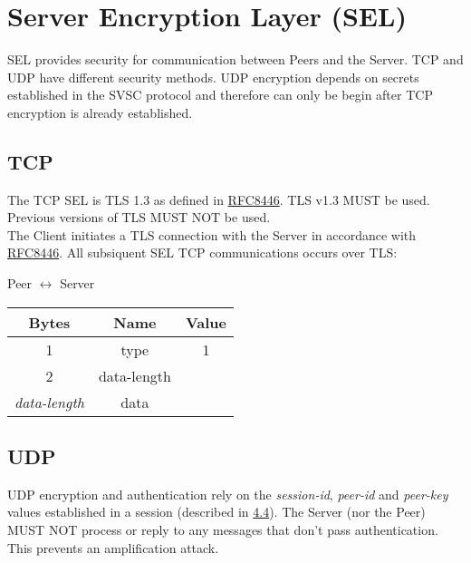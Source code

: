 \section{Server Encryption Layer (SEL)}

SEL provides security for communication between Peers and the Server. TCP and UDP have
different security methods. UDP encryption depends on secrets established in the SVSC protocol and therefore can only
be begin after TCP encryption is already established.

\subsection{TCP}

The TCP SEL is TLS 1.3 as defined in
\href{https://datatracker.ietf.org/doc/html/rfc8446}{RFC8446}. TLS v1.3 MUST be used. Previous versions of TLS MUST NOT be used.\\

The Client initiates a TLS connection with the Server in accordance with \href{https://datatracker.ietf.org/doc/html/rfc8446}{RFC8446}. All subsiquent SEL TCP communications occurs over TLS:

\begin{center}
    Peer $\leftrightarrow$ Server\\
    \begin{tabular}{|c|c|c|}
        \hline
        \textbf{Bytes}     & \textbf{Name} & \textbf{Value} \\
        \hline
        1                  & type          & 1              \\
        \hline
        2                  & data-length   &                \\
        \hline
        \emph{data-length} & data          &                \\
        \hline
    \end{tabular}
\end{center}

\subsection{UDP}

UDP encryption and authentication rely on the \emph{session-id}, \emph{peer-id} and \emph{peer-key} values
established in a session
(described in \hyperlink{subsection.4.4}{4.4}). The Server (nor the Peer) MUST NOT
process or reply to any messages that don't pass authentication. This prevents an amplification attack.\\

